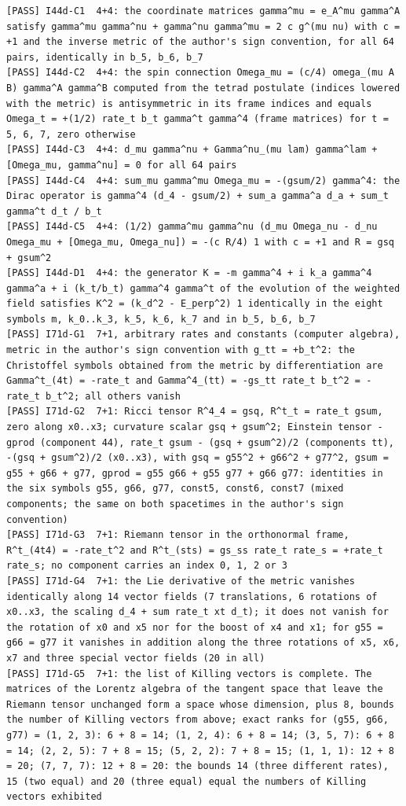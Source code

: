 \documentclass[
  10pt,
]{article}
\begin{document}
\begin{verbatim}
[PASS] I44d-C1  4+4: the coordinate matrices gamma^mu = e_A^mu gamma^A satisfy gamma^mu gamma^nu + gamma^nu gamma^mu = 2 c g^(mu nu) with c = +1 and the inverse metric of the author's sign convention, for all 64 pairs, identically in b_5, b_6, b_7
[PASS] I44d-C2  4+4: the spin connection Omega_mu = (c/4) omega_(mu A B) gamma^A gamma^B computed from the tetrad postulate (indices lowered with the metric) is antisymmetric in its frame indices and equals Omega_t = +(1/2) rate_t b_t gamma^t gamma^4 (frame matrices) for t = 5, 6, 7, zero otherwise
[PASS] I44d-C3  4+4: d_mu gamma^nu + Gamma^nu_(mu lam) gamma^lam + [Omega_mu, gamma^nu] = 0 for all 64 pairs
[PASS] I44d-C4  4+4: sum_mu gamma^mu Omega_mu = -(gsum/2) gamma^4: the Dirac operator is gamma^4 (d_4 - gsum/2) + sum_a gamma^a d_a + sum_t gamma^t d_t / b_t
[PASS] I44d-C5  4+4: (1/2) gamma^mu gamma^nu (d_mu Omega_nu - d_nu Omega_mu + [Omega_mu, Omega_nu]) = -(c R/4) 1 with c = +1 and R = gsq + gsum^2
[PASS] I44d-D1  4+4: the generator K = -m gamma^4 + i k_a gamma^4 gamma^a + i (k_t/b_t) gamma^4 gamma^t of the evolution of the weighted field satisfies K^2 = (k_d^2 - E_perp^2) 1 identically in the eight symbols m, k_0..k_3, k_5, k_6, k_7 and in b_5, b_6, b_7
[PASS] I71d-G1  7+1, arbitrary rates and constants (computer algebra), metric in the author's sign convention with g_tt = +b_t^2: the Christoffel symbols obtained from the metric by differentiation are Gamma^t_(4t) = -rate_t and Gamma^4_(tt) = -gs_tt rate_t b_t^2 = - rate_t b_t^2; all others vanish
[PASS] I71d-G2  7+1: Ricci tensor R^4_4 = gsq, R^t_t = rate_t gsum, zero along x0..x3; curvature scalar gsq + gsum^2; Einstein tensor -gprod (component 44), rate_t gsum - (gsq + gsum^2)/2 (components tt), -(gsq + gsum^2)/2 (x0..x3), with gsq = g55^2 + g66^2 + g77^2, gsum = g55 + g66 + g77, gprod = g55 g66 + g55 g77 + g66 g77: identities in the six symbols g55, g66, g77, const5, const6, const7 (mixed components; the same on both spacetimes in the author's sign convention)
[PASS] I71d-G3  7+1: Riemann tensor in the orthonormal frame, R^t_(4t4) = -rate_t^2 and R^t_(sts) = gs_ss rate_t rate_s = +rate_t rate_s; no component carries an index 0, 1, 2 or 3
[PASS] I71d-G4  7+1: the Lie derivative of the metric vanishes identically along 14 vector fields (7 translations, 6 rotations of x0..x3, the scaling d_4 + sum rate_t xt d_t); it does not vanish for the rotation of x0 and x5 nor for the boost of x4 and x1; for g55 = g66 = g77 it vanishes in addition along the three rotations of x5, x6, x7 and three special vector fields (20 in all)
[PASS] I71d-G5  7+1: the list of Killing vectors is complete. The matrices of the Lorentz algebra of the tangent space that leave the Riemann tensor unchanged form a space whose dimension, plus 8, bounds the number of Killing vectors from above; exact ranks for (g55, g66, g77) = (1, 2, 3): 6 + 8 = 14; (1, 2, 4): 6 + 8 = 14; (3, 5, 7): 6 + 8 = 14; (2, 2, 5): 7 + 8 = 15; (5, 2, 2): 7 + 8 = 15; (1, 1, 1): 12 + 8 = 20; (7, 7, 7): 12 + 8 = 20: the bounds 14 (three different rates), 15 (two equal) and 20 (three equal) equal the numbers of Killing vectors exhibited

\end{verbatim}
\end{document}
